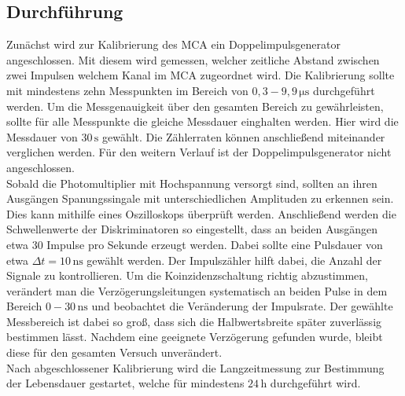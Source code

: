 \subsection{Durchführung}
\label{sec:Durchführung}
Zunächst wird zur Kalibrierung des MCA ein Doppelimpulsgenerator angeschlossen. Mit diesem wird gemessen, welcher zeitliche Abstand zwischen zwei Impulsen welchem Kanal im 
MCA zugeordnet wird. Die Kalibrierung sollte mit mindestens zehn Messpunkten im Bereich von $0,3 - 9,9 \,\unit{\micro\second}$ durchgeführt werden. 
Um die Messgenauigkeit über den gesamten Bereich zu gewährleisten, sollte für alle Messpunkte die gleiche Messdauer einghalten werden. Hier wird die Messdauer von $30\,\unit{\second}$ gewählt.
Die Zählerraten können anschließend miteinander verglichen werden. Für den weitern Verlauf ist der Doppelimpulsgenerator nicht angeschlossen.\\
Sobald die Photomultiplier mit Hochspannung versorgt sind, sollten an ihren Ausgängen Spanungssingale mit unterschiedlichen Amplituden zu erkennen sein.
Dies kann mithilfe eines Oszilloskops überprüft werden.
Anschließend werden die Schwellenwerte der Diskriminatoren so eingestellt, dass an beiden Ausgängen etwa 30 Impulse pro Sekunde erzeugt werden. Dabei sollte eine
Pulsdauer von etwa $\Delta t = 10\,\unit{\nano\second}$ gewählt werden. Der Impulszähler hilft dabei, die Anzahl der Signale zu kontrollieren. Um die Koinzidenzschaltung richtig abzustimmen,
verändert man die Verzögerungsleitungen systematisch an beiden Pulse in dem Bereich $0-30\,\unit{\nano\second}$ und beobachtet die Veränderung der Impulsrate. Der gewählte Messbereich
ist dabei so groß, dass sich die Halbwertsbreite später zuverlässig bestimmen lässt. Nachdem eine geeignete Verzögerung gefunden wurde, bleibt diese für den gesamten Versuch unverändert.\\
Nach abgeschlossener Kalibrierung wird die Langzeitmessung zur Bestimmung der Lebensdauer gestartet, welche für mindestens $24\,\unit{\hour}$ durchgeführt wird.
